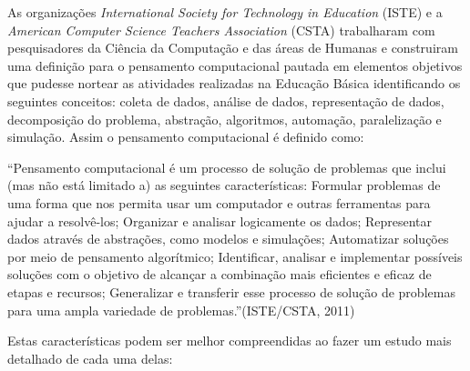 \documentclass[12pt, openright, a4paper, brazil, openany, oneside]{abntex2}
\begin{document}
As organizações \textit{International Society for Technology in Education} (ISTE) e a \textit{American Computer Science Teachers Association} (CSTA) trabalharam com pesquisadores da Ciência da Computação e das áreas de Humanas e construiram uma definição para o pensamento computacional pautada em elementos objetivos que pudesse nortear as atividades realizadas na Educação Básica identificando os seguintes conceitos: coleta de dados, análise de dados, representação de dados, decomposição do problema, abstração, algoritmos, automação, paralelização e simulação. Assim o pensamento computacional é definido como:

\begin{citacao}

``Pensamento computacional é um processo de solução de problemas que inclui (mas não está limitado a) as seguintes características: Formular problemas de uma forma que nos permita usar um computador e outras ferramentas para ajudar a resolvê-los; Organizar e analisar logicamente os dados; Representar dados através de abstrações, como modelos e simulações; Automatizar soluções por meio de pensamento algorítmico; Identificar, analisar e implementar possíveis soluções com o objetivo de alcançar a combinação mais eficientes e eficaz de etapas e recursos; Generalizar e transferir esse processo de solução de problemas para uma ampla variedade de problemas.''\cite{iste/csta}(ISTE/CSTA, 2011)

\end{citacao}

Estas características podem ser melhor compreendidas ao fazer um estudo mais detalhado de cada uma delas:
\end{document}
